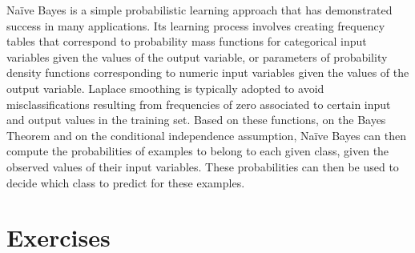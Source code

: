 Na\"ive Bayes is a simple probabilistic learning approach that has demonstrated success in many applications. Its learning process involves creating frequency tables that correspond to probability mass functions for categorical input variables given the values of the output variable, or parameters of probability density functions corresponding to numeric input variables given the values of the output variable. Laplace smoothing is typically adopted to avoid misclassifications resulting from frequencies of zero associated to certain input and output values in the training set. Based on these functions, on the Bayes Theorem and on the conditional independence assumption, Na\"ive Bayes can then compute the probabilities of examples to belong to each given class, given the observed values of their input variables. These probabilities can then be used to decide which class to predict for these examples.


\section{Exercises}


